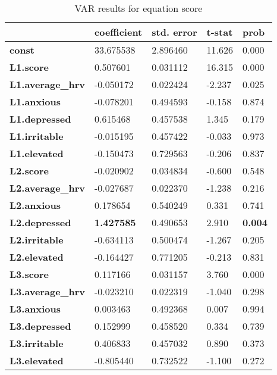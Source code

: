 \documentclass{article}
\begin{document}
\begin{table}[ht]
    \centering
    \begin{tabular}{lllll}
      \toprule\
        ~ & \textbf{coefficient} & \textbf{std. error} & \textbf{t-stat} & \textbf{prob} \\ \midrule
        \textbf{const} & 33.675538 & 2.896460 & 11.626 & 0.000 \\ 
        \textbf{L1.score} & 0.507601 & 0.031112 & 16.315 & 0.000 \\ 
        \textbf{L1.average\_hrv} & -0.050172 & 0.022424 & -2.237 & 0.025 \\ 
        \textbf{L1.anxious} & -0.078201 & 0.494593 & -0.158 & 0.874 \\ 
        \textbf{L1.depressed} & 0.615468 & 0.457538 & 1.345 & 0.179 \\ 
        \textbf{L1.irritable} & -0.015195 & 0.457422 & -0.033 & 0.973 \\ 
        \textbf{L1.elevated} & -0.150473 & 0.729563 & -0.206 & 0.837 \\ 
        \textbf{L2.score} & -0.020902 & 0.034834 & -0.600 & 0.548 \\ 
        \textbf{L2.average\_hrv} & -0.027687 & 0.022370 & -1.238 & 0.216 \\ 
        \textbf{L2.anxious} & 0.178654 & 0.540249 & 0.331 & 0.741 \\ 
        \textbf{L2.depressed} & \textbf{1.427585} & 0.490653 & 2.910 & \textbf{0.004} \\ 
        \textbf{L2.irritable} & -0.634113 & 0.500474 & -1.267 & 0.205 \\ 
        \textbf{L2.elevated} & -0.164427 & 0.771205 & -0.213 & 0.831 \\ 
        \textbf{L3.score} & 0.117166 & 0.031157 & 3.760 & 0.000 \\ 
        \textbf{L3.average\_hrv} & -0.023210 & 0.022319 & -1.040 & 0.298 \\ 
        \textbf{L3.anxious} & 0.003463 & 0.492368 & 0.007 & 0.994 \\ 
        \textbf{L3.depressed} & 0.152999 & 0.458520 & 0.334 & 0.739 \\ 
        \textbf{L3.irritable} & 0.406833 & 0.457032 & 0.890 & 0.373 \\ 
        \textbf{L3.elevated} & -0.805440 & 0.732522 & -1.100 & 0.272 \\ \bottomrule
    \end{tabular}
    \caption{VAR results for equation score}
    \label{VAR Score Results}
\end{table}
\end{document}
